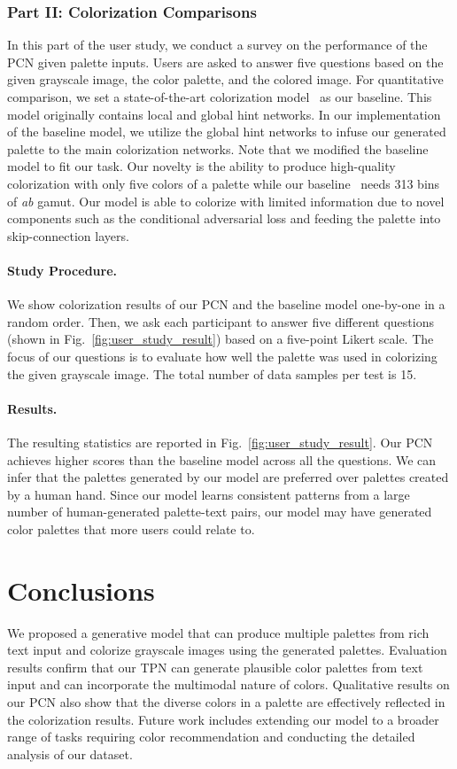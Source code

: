 \documentclass[runningheads]{llncs}
\begin{document}
\subsubsection{Part II: Colorization Comparisons}
In this part of the user study, we conduct a survey on the performance of the PCN given palette inputs. Users are asked to answer five questions based on the given grayscale image, the color palette, and the colored image. For quantitative comparison, we set a state-of-the-art colorization model~\cite{zhang2017real} as our baseline. This model originally contains local and global hint networks. In our implementation of the baseline model, we utilize the global hint networks to infuse our generated palette to the main colorization networks. Note that we modified the baseline model to fit our task. Our novelty is the ability to produce high-quality colorization with only five colors of a palette while our baseline~\cite{zhang2017real} needs 313 bins of \emph{ab} gamut. Our model is able to colorize with limited information due to novel components such as the conditional adversarial loss and feeding the palette into skip-connection layers.

\paragraph{Study Procedure.} 
We show colorization results of our PCN and the baseline model one-by-one in a random order. Then, we ask each participant to answer five different questions (shown in Fig.~\ref{fig:user_study_result}) based on a five-point Likert scale. The focus of our questions is to evaluate how well the palette was used in colorizing the given grayscale image. The total number of data samples per test is 15.

\paragraph{Results.}
The resulting statistics are reported in Fig.~\ref{fig:user_study_result}. Our PCN achieves higher scores than the baseline model across all the questions. We can infer that the palettes generated by our model are preferred over palettes created by a human hand. Since our model learns consistent patterns from a large number of human-generated palette-text pairs, our model may have generated color palettes that more users could relate to.

\section{Conclusions}
We proposed a generative model that can produce multiple palettes from rich text input and colorize grayscale images using the generated palettes. Evaluation results confirm that our TPN can generate plausible color palettes from text input and can incorporate the multimodal nature of colors. Qualitative results on our PCN also show that the diverse colors in a palette are effectively reflected in the colorization results. Future work includes extending our model to a broader range of tasks requiring color recommendation and conducting the detailed analysis of our dataset.  
\end{document}
